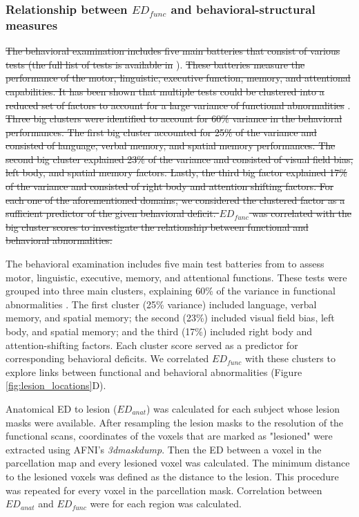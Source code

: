 \documentclass[fleqn,10pt]{wlscirep}
\begin{document}
\subsubsection*{Relationship between $\textit{ED}_{{func}}$ and behavioral-structural measures}

\color{red}\st{The behavioral examination includes five main batteries that consist of various tests (the full list of tests is available in} \citet{corbetta2015common}). \st{These batteries measure the performance of the motor, linguistic, executive function, memory, and attentional capabilities. It has been shown that multiple tests could be clustered into a reduced set of factors to account for a large variance of functional abnormalities} \citep{corbetta2015common}. \st{Three big clusters were identified to account for 60\% variance in the behavioral performances. The first big cluster accounted for 25\% of the variance and consisted of language, verbal memory, and spatial memory performances. The second big cluster explained 23\% of the variance and consisted of visual field bias, left body, and spatial memory factors. Lastly, the third big factor explained 17\% of the variance and consisted of right body and attention shifting factors. For each one of the aforementioned domains, we considered the clustered factor as a sufficient predictor of the given behavioral deficit. $\textit{ED}_{{func}}$ was correlated with the big cluster scores to investigate the relationship between functional and behavioral abnormalities.}

\color{blue}
The behavioral examination includes five main test batteries from \citet{corbetta2015common} to assess motor, linguistic, executive, memory, and attentional functions. These tests were grouped into three main clusters, explaining 60\% of the variance in functional abnormalities \citep{corbetta2015common}. The first cluster (25\% variance) included language, verbal memory, and spatial memory; the second (23\%) included visual field bias, left body, and spatial memory; and the third (17\%) included right body and attention-shifting factors. Each cluster score served as a predictor for corresponding behavioral deficits. We correlated $\textit{ED}_{{func}}$ with these clusters to explore links between functional and behavioral abnormalities (Figure \ref{fig:lesion_locations}D).
\color{black}

Anatomical ED to lesion ($\textit{ED}_{{anat}}$) was calculated for each subject whose lesion masks were available. After resampling the lesion masks to the resolution of the functional scans, coordinates of the voxels that are marked as "lesioned" were extracted using AFNI's \emph{3dmaskdump}. Then the ED between a voxel in the parcellation map and every lesioned voxel was calculated. The minimum distance to the lesioned voxels was defined as the distance to the lesion. This procedure was repeated for every voxel in the parcellation mask. Correlation between $\textit{ED}_{{anat}}$ and $\textit{ED}_{{func}}$ were for each region was calculated.   
\end{document}
